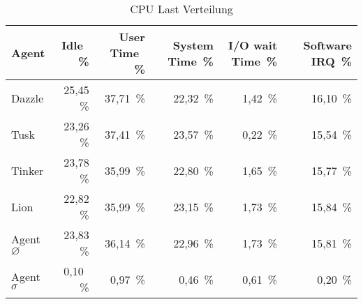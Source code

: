 \begin{table}
\centering
\begin{tabular}{l%
 r<{\,\%}%
 r<{\,\%}%
 r<{\,\%}%
 r<{\,\%}%
 r<{\,\%}%
}
Agent  				& Idle			& User Time		& System Time		& I/O wait Time	& Software IRQ	\\
\hline
Dazzle 				& 25,45			& 37,71			& 22,32 		& 1,42		& 16,10	\\
Tusk 				& 23,26			& 37,41			& 23,57			& 0,22		& 15,54	\\
Tinker				& 23,78			& 35,99			& 22,80			& 1,65		& 15,77	\\
Lion				& 22,82			& 35,99			& 23,15			& 1,73		& 15,84	\\ 
Agent $\diameter $  		& 23,83			& 36,14			& 22,96			& 1,73	 	& 15,81	\\   
Agent $\sigma $			&  0,10			&  0,97			&  0,46			& 0,61		& 0,20      \\
\end{tabular}
\caption{CPU Last Verteilung}
\label{tab:standardTraffic}
\end{table}



